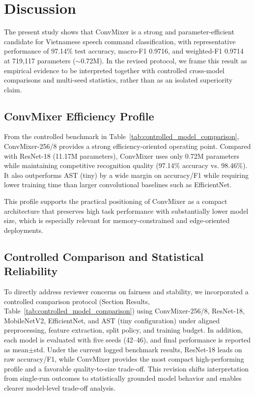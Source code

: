 \section*{Discussion}
The present study shows that ConvMixer \cite{trockman2022patchesneed} is a strong and parameter-efficient candidate for Vietnamese speech command classification, with representative performance of 97.14\% test accuracy, macro-F1 0.9716, and weighted-F1 0.9714 at 719,117 parameters ($\sim$0.72M). In the revised protocol, we frame this result as empirical evidence to be interpreted together with controlled cross-model comparisons and multi-seed statistics, rather than as an isolated superiority claim.

\subsection*{ConvMixer Efficiency Profile}

From the controlled benchmark in Table~\ref{tab:controlled_model_comparison}, ConvMixer-256/8 provides a strong efficiency-oriented operating point. Compared with ResNet-18 (11.17M parameters), ConvMixer uses only 0.72M parameters while maintaining competitive recognition quality (97.14\% accuracy vs. 98.46\%). It also outperforms AST (tiny) by a wide margin on accuracy/F1 while requiring lower training time than larger convolutional baselines such as EfficientNet.

This profile supports the practical positioning of ConvMixer as a compact architecture that preserves high task performance with substantially lower model size, which is especially relevant for memory-constrained and edge-oriented deployments.

\subsection*{Controlled Comparison and Statistical Reliability}

To directly address reviewer concerns on fairness and stability, we incorporated a controlled comparison protocol (Section Results, Table~\ref{tab:controlled_model_comparison}) using ConvMixer-256/8, ResNet-18, MobileNetV2, EfficientNet, and AST (tiny configuration) under aligned preprocessing, feature extraction, split policy, and training budget. In addition, each model is evaluated with five seeds (42--46), and final performance is reported as mean$\pm$std. Under the current logged benchmark results, ResNet-18 leads on raw accuracy/F1, while ConvMixer provides the most compact high-performing profile and a favorable quality-to-size trade-off. This revision shifts interpretation from single-run outcomes to statistically grounded model behavior and enables clearer model-level trade-off analysis.


